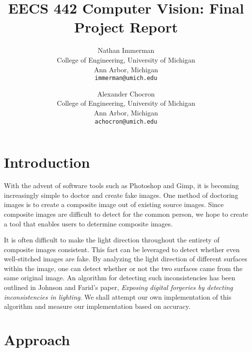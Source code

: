 \documentclass[10pt,twocolumn,letterpaper]{article}
\begin{document}
\title{EECS 442 Computer Vision: Final Project Report}

\author{Nathan Immerman\\
College of Engineering, University of Michigan\\
Ann Arbor, Michigan\\
{\tt\small immerman@umich.edu}
\and
Alexander Chocron\\
College of Engineering, University of Michigan\\
Ann Arbor, Michigan\\
{\tt\small achocron@umich.edu}
}

\maketitle

\section{Introduction}

With the advent of software tools such as Photoshop and Gimp, it is becoming increasingly simple to doctor and create fake images. One method of doctoring images is to create a composite image out of existing source images. Since composite images are difficult to detect for the common person, we hope to create a tool that enables users to determine composite images.

It is often difficult to make the light direction throughout the entirety of composite images consistent. This fact can be leveraged to detect whether even well-stitched images are fake. By analyzing the light direction of different surfaces within the image, one can detect whether or not the two surfaces came from the same original image. An algorithm for detecting such inconsistencies has been outlined in Johnson and Farid's paper, \emph{Exposing digital forgeries by detecting inconsistencies in lighting}. We shall attempt our own implementation of this algorithm and measure our implementation based on accuracy.
\section{Approach}
\end{document}
